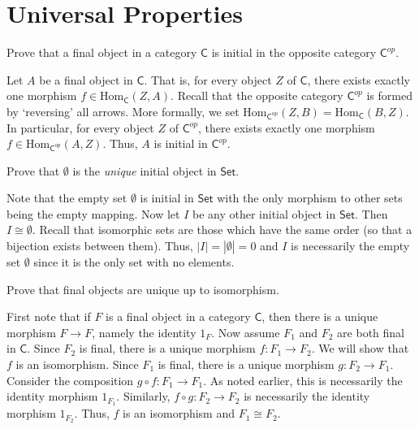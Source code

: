 \documentclass[../../master.tex]{subfiles}
\begin{document}
\section{Universal Properties}

    \begin{problem}
      Prove that a final object in a category \(\mathsf{C}\) is initial in the opposite category \(\mathsf{C}^{op}\).
    \end{problem}

    \begin{solution}
      Let \(A\) be a final object in \(\mathsf{C}\).
      That is, for every object \(Z\) of \(\mathsf{C}\), there exists exactly one morphism \(f \in \text{Hom}_{\mathsf{C}}(Z, A)\).
      Recall that the opposite category \(\mathsf{C}^{op}\) is formed by `reversing' all arrows.
      More formally, we set \(\text{Hom}_{\mathsf{C}^{op}}(Z, B) = \text{Hom}_{\mathsf{C}}(B, Z)\).
      In particular, for every object \(Z\) of \(\mathsf{C}^{op}\), there exists exactly one morphism \(f \in \text{Hom}_{\mathsf{C}^{op}}(A, Z)\).
      Thus, \(A\) is initial in \(\mathsf{C}^{op}\).
    \end{solution}

    \begin{problem}
      Prove that \(\emptyset\) is the \textit{unique} initial object in \(\mathsf{Set}\).
    \end{problem}

    \begin{solution}
      Note that the empty set \(\emptyset\) is initial in \(\mathsf{Set}\) with the only morphism to other sets being the empty mapping.
      Now let \(I\) be any other initial object in \(\mathsf{Set}\).
      Then \(I \cong \emptyset\).
      Recall that isomorphic sets are those which have the same order (so that a bijection exists between them).
      Thus, \(|I| = |\emptyset| = 0\) and \(I\) is necessarily the empty set \(\emptyset\) since it is the only set with no elements.
    \end{solution}

    \begin{problem}
      Prove that final objects are unique up to isomorphism.
    \end{problem}

    \begin{solution}
      First note that if \(F\) is a final object in a category \(\mathsf{C}\), then there is a unique morphism \(F \to F\), namely the identity \(1_{F}\).
      Now assume \(F_{1}\) and \(F_{2}\) are both final in \(\mathsf{C}\).
      Since \(F_{2}\) is final, there is a unique morphism \(f: F_{1} \to F_{2}\).
      We will show that \(f\) is an isomorphism.
      Since \(F_{1}\) is final, there is a unique morphism \(g: F_{2} \to F_{1}\).
      Consider the composition \(g \circ f: F_{1} \to F_{1}\).
      As noted earlier, this is necessarily the identity morphism \(1_{F_{1}}\).
      Similarly, \(f \circ g: F_{2} \to F_{2}\) is necessarily the identity morphism \(1_{F_{2}}\).
      Thus, \(f\) is an isomorphism and \(F_{1} \cong F_{2}\).
    \end{solution}
\end{document}
